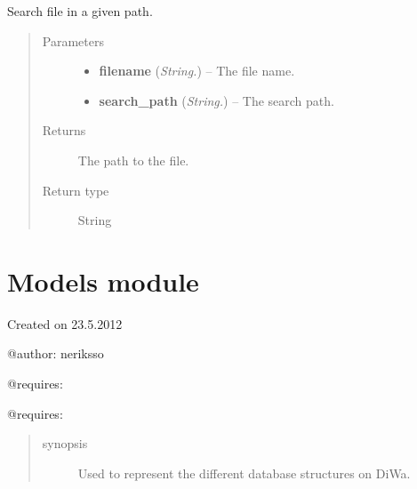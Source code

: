 \documentclass[letterpaper,10pt,english]{sphinxmanual}
\begin{document}
\begin{fulllineitems}
\label{api:filesystem.SearchFile}
Search file in a given path.
\begin{quote}\begin{description}
\item[{Parameters}] \leavevmode\begin{itemize}
\item {} 
\textbf{filename} (\emph{String.}) -- The file name.

\item {} 
\textbf{search\_path} (\emph{String.}) -- The search path.

\end{itemize}

\item[{Returns}] \leavevmode
The path to the file.

\item[{Return type}] \leavevmode
String

\end{description}\end{quote}

\end{fulllineitems}



\section{Models module}
\label{api:module-models}\label{api:models-module}
Created on 23.5.2012

@author: neriksso

@requires: 

@requires: 
\begin{quote}\begin{description}
\item[{synopsis}] \leavevmode
Used to represent the different database structures on DiWa.

\end{description}\end{quote}
\end{document}
